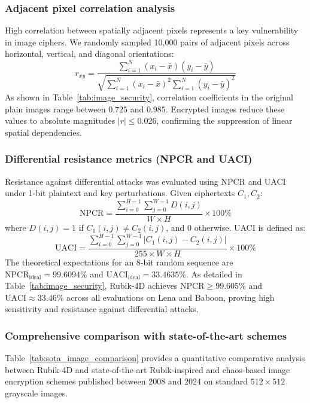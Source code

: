\documentclass[10pt,twocolumn]{article}
\begin{document}
\subsubsection{Adjacent pixel correlation analysis}
High correlation between spatially adjacent pixels represents a key vulnerability in image ciphers. We randomly sampled 10,000 pairs of adjacent pixels across horizontal, vertical, and diagonal orientations:
\begin{equation}
    r_{xy} = \frac{\sum_{i=1}^{N} (x_i - \bar{x})(y_i - \bar{y})}{\sqrt{\sum_{i=1}^{N}(x_i - \bar{x})^2 \sum_{i=1}^{N}(y_i - \bar{y})^2}}
\end{equation}
As shown in Table~\ref{tab:image_security}, correlation coefficients in the original plain images range between $0.725$ and $0.985$. Encrypted images reduce these values to absolute magnitudes $|r| \le 0.026$, confirming the suppression of linear spatial dependencies.

\subsubsection{Differential resistance metrics (NPCR and UACI)}
Resistance against differential attacks was evaluated using NPCR and UACI under 1-bit plaintext and key perturbations. Given ciphertexts $C_1, C_2$:
\begin{equation}
    \text{NPCR} = \frac{\sum_{i=0}^{H-1} \sum_{j=0}^{W-1} D(i, j)}{W \times H} \times 100\%
\end{equation}
where $D(i, j) = 1$ if $C_1(i, j) \neq C_2(i, j)$, and $0$ otherwise. UACI is defined as:
\begin{equation}
    \text{UACI} = \frac{\sum_{i=0}^{H-1} \sum_{j=0}^{W-1} |C_1(i, j) - C_2(i, j)|}{255 \times W \times H} \times 100\%
\end{equation}
The theoretical expectations for an 8-bit random sequence are $\text{NPCR}_{\text{ideal}} = 99.6094\%$ and $\text{UACI}_{\text{ideal}} = 33.4635\%$. As detailed in Table~\ref{tab:image_security}, Rubik-4D achieves $\text{NPCR} \ge 99.605\%$ and $\text{UACI} \approx 33.46\%$ across all evaluations on Lena and Baboon, proving high sensitivity and resistance against differential attacks.

\subsubsection{Comprehensive comparison with state-of-the-art schemes}
Table~\ref{tab:sota_image_comparison} provides a quantitative comparative analysis between Rubik-4D and state-of-the-art Rubik-inspired and chaos-based image encryption schemes published between 2008 and 2024 on standard $512 \times 512$ grayscale images.
\end{document}
